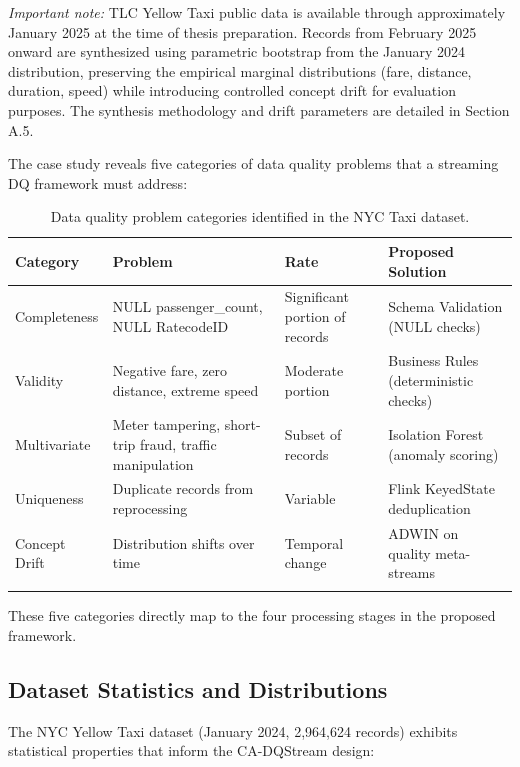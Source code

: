 \textit{Important note:} TLC Yellow Taxi public data is available through approximately January 2025 at the time of thesis preparation. Records from February 2025 onward are synthesized using parametric bootstrap from the January 2024 distribution, preserving the empirical marginal distributions (fare, distance, duration, speed) while introducing controlled concept drift for evaluation purposes. The synthesis methodology and drift parameters are detailed in Section A.5.

The case study reveals five categories of data quality problems that a streaming DQ framework must address:

\begin{longtable}{|m{2.2cm}|m{3.5cm}|m{2.5cm}|m{4.5cm}|}
\hline
\textbf{Category} & \textbf{Problem} & \textbf{Rate} & \textbf{Proposed Solution} \\ \hline
Completeness & NULL passenger\_count, NULL RatecodeID & Significant portion of records & Schema Validation (NULL checks) \\ \hline
Validity & Negative fare, zero distance, extreme speed & Moderate portion & Business Rules (deterministic checks) \\ \hline
Multivariate & Meter tampering, short-trip fraud, traffic manipulation & Subset of records & Isolation Forest (anomaly scoring) \\ \hline
Uniqueness & Duplicate records from reprocessing & Variable & Flink KeyedState deduplication \\ \hline
Concept Drift & Distribution shifts over time & Temporal change & ADWIN on quality meta-streams \\ \hline
\caption{Data quality problem categories identified in the NYC Taxi dataset.}
\label{tab:dq_categories}
\end{longtable}

These five categories directly map to the four processing stages in the proposed framework.

\subsection{Dataset Statistics and Distributions}

The NYC Yellow Taxi dataset (January 2024, 2,964,624 records) exhibits statistical properties that inform the CA-DQStream design:

